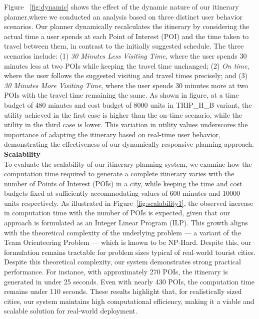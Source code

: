 Figure ~\ref{fig:dynamic} shows the effect of the dynamic nature of our itinerary planner,where we conducted an analysis based on three distinct user behavior scenarios. Our planner dynamically recalculates the itinerary by considering the actual time a user spends at each Point of Interest (POI) and the time taken to travel between them, in contrast to the initially suggested schedule. The three scenarios include: (1) \textit{30 Minutes Less Visiting Time}, where the user spends 30 minutes less at two POIs while keeping the travel time unchanged; (2) \textit{On time}, where the user follows the suggested visiting and travel times precisely; and (3) \textit{30 Minutes More Visiting Time}, where the user spends 30 minutes more at two POIs with the travel time remaining the same. As shown in figure, at a time budget of 480 minutes and cost budget of 8000 units in TRIP\_H\_B variant, the utility achieved in the first case is higher than the on-time scenario, while the utility in the third case is lower. This variation in utility values underscores the importance of adapting the itinerary based on real-time user behavior, demonstrating the effectiveness of our dynamically responsive planning approach.\\


\noindent\textbf{Scalability}\\
To evaluate the scalability of our itinerary planning system, we examine how the computation time required to generate a complete itinerary varies with the number of Points of Interest (POIs) in a city, while keeping the time and cost budgets fixed at sufficiently accommodating values of 600 minutes and 10000 units respectively. As illustrated in Figure~\ref{fig:scalability1}, the observed increase in computation time with the number of POIs is expected, given that our approach is formulated as an Integer Linear Program (ILP). This growth aligns with the theoretical complexity of the underlying problem — a variant of the Team Orienteering Problem — which is known to be NP-Hard. Despite this, our formulation remains tractable for problem sizes typical of real-world tourist cities. Despite this theoretical complexity, our system demonstrates strong practical performance. For instance, with approximately 270 POIs, the itinerary is generated in under 25 seconds. Even with nearly 430 POIs, the computation time remains under 110 seconds. These results highlight that, for realistically sized cities, our system maintains high computational efficiency, making it a viable and scalable solution for real-world deployment.

